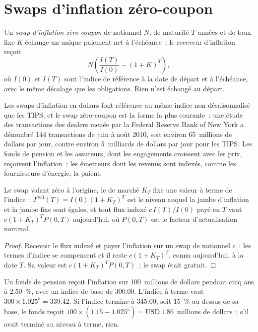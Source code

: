 \section{Swaps d'inflation zéro-coupon}

\begin{definition}\label{def:m2:inflation-markets:zciis}
Un \emph{swap d'inflation zéro-coupon} de notionnel
$N$, de maturité $T$ années et de taux fixe $K$ échange un unique paiement net à
l'échéance~: le receveur d'inflation reçoit
\[
N\left(\frac{I(T)}{I(0)} - (1+K)^T\right),
\]
où $I(0)$ et $I(T)$ sont l'indice de référence à la date de départ et à l'échéance,
avec le même décalage que les obligations. Rien n'est échangé au départ.
\end{definition}

Les swaps d'inflation en dollars font référence au même indice non désaisonnalisé que
les TIPS, et le swap zéro-coupon est la forme la plus courante~: une étude des transactions des dealers
menée par la Federal Reserve Bank of New York a dénombré 144 transactions de juin à
août 2010, soit environ 65~millions de dollars par jour, contre environ 5~milliards de dollars par jour
pour les TIPS. Les fonds de pension et les assureurs, dont les engagements croissent avec les prix, reçoivent
l'inflation~; les émetteurs dont les revenus sont indexés, comme les fournisseurs d'énergie, la paient.

\begin{proposition}\label{prop:m2:inflation-markets:forward}
Le swap valant zéro à l'origine, le  de marché $K_T$
fixe une valeur à terme de l'indice~: $I^{\mathrm{fwd}}(T) = I(0)(1+K_T)^T$ est le
niveau auquel la jambe d'inflation et la jambe fixe sont égales, et tout
flux indexé $c\,I(T)/I(0)$ payé en $T$ vaut
$c(1+K_T)^T P(0,T)$ aujourd'hui, où $P(0,T)$ est le facteur d'actualisation nominal.
\end{proposition}

\begin{proof}
Recevoir le flux indexé et payer l'inflation sur un swap de notionnel $c$~:
les termes d'indice se compensent et il reste $c(1+K_T)^T$, connu aujourd'hui, à la date $T$. Sa
valeur est $c(1+K_T)^T P(0,T)$~; le swap était gratuit.
\end{proof}

\begin{example}\label{ex:m2:inflation-markets:swap}
Un fonds de pension reçoit l'inflation sur 100~millions de dollars pendant cinq ans à 2.50~\%,
avec un indice de base de 300.00. L'indice à terme vaut $300 \times 1.025^5 = 339.42$.
Si l'indice termine à 345.00, soit 15~\% au-dessus de sa base, le fonds reçoit
$100 \times (1.15 - 1.025^5) = \text{USD}~1.86$~millions de dollars~; s'il avait
terminé au niveau à terme, rien.
\end{example}

